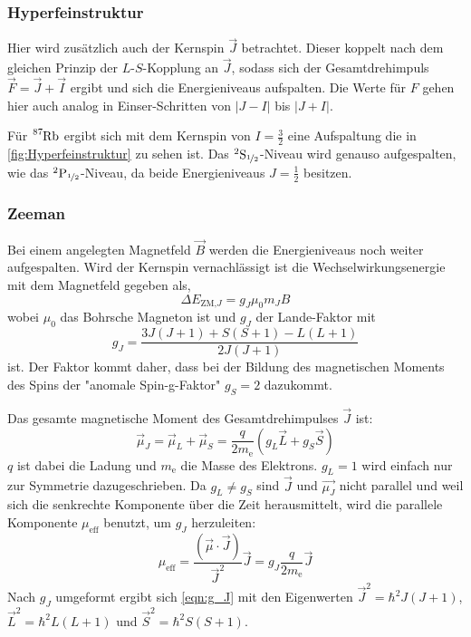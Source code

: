         \subsubsection*{Hyperfeinstruktur}
            Hier wird zusätzlich auch der Kernspin $\vec{J}$ betrachtet. Dieser koppelt nach dem gleichen Prinzip der $L$-$S$-Kopplung an $\vec{J}$, sodass sich der Gesamtdrehimpuls $\vec{F} = \vec{J} + \vec{I}$ ergibt und sich die Energieniveaus aufspalten.
            Die Werte für $F$ gehen hier auch analog in Einser-Schritten von $|J - I|$ bis $|J + I|$.

            Für $\ce{^{87}Rb}$ ergibt sich mit dem Kernspin von $I = \frac{3}{2}$ eine Aufspaltung die in \autoref{fig:Hyperfeinstruktur} zu sehen ist. Das $^2\text{S}_{\nicefrac{1}{2}}$-Niveau wird genauso aufgespalten, wie das $^2\text{P}_{\nicefrac{1}{2}}$-Niveau, da beide Energieniveaus $J = \frac{1}{2}$ besitzen.

        \subsubsection*{Zeeman}
            Bei einem angelegten Magnetfeld $\vec{B}$ werden die Energieniveaus noch weiter aufgespalten.
            Wird der Kernspin vernachlässigt ist die Wechselwirkungsenergie mit dem Magnetfeld gegeben als,
            \begin{equation*}
                \Delta E_{\text{ZM,}J} = g_J \mu_0 m_J B
            \end{equation*}
            wobei $\mu_0$ das Bohrsche Magneton ist und $g_J$ der Lande-Faktor mit
            \begin{equation}
                g_J = \frac{3J(J+1) + S(S+1) - L(L+1)}{2J(J+1)}
                \label{eqn:g_J}
            \end{equation}
            ist. Der Faktor kommt daher, dass bei der Bildung des magnetischen Moments des Spins der "anomale Spin-g-Faktor" $g_S = 2$ dazukommt.

            Das gesamte magnetische Moment des Gesamtdrehimpulses $\vec{J}$ ist:
            \begin{equation*}
                \vec{\mu}_J = \vec{\mu}_L + \vec{\mu}_S = \frac{q}{2m_{\text{e}}} \left(g_L \vec{L} + g_S \vec{S}\right)
            \end{equation*}
            $q$ ist dabei die Ladung und $m_\text{e}$ die Masse des Elektrons. $g_L = 1$ wird einfach nur zur Symmetrie dazugeschrieben. Da $g_L \neq g_S$ sind $\vec{J}$ und $\vec{\mu_J}$ nicht parallel und weil sich die senkrechte Komponente über die Zeit herausmittelt, wird die parallele Komponente $\mu_{\text{eff}}$ benutzt, um $g_J$ herzuleiten:
            \begin{equation*}
                \mu_{\text{eff}} = \frac{(\vec{\mu} \cdot \vec{J})}{\vec{J}^2} \vec{J} = g_J \frac{q}{2m_{\text{e}}} \vec{J}
            \end{equation*}
            Nach $g_J$ umgeformt ergibt sich \eqref{eqn:g_J} mit den Eigenwerten $\vec{J}^2 = \hbar^2 J (J+1)$, $\vec{L}^2 = \hbar^2 L (L+1)$ und $\vec{S}^2 = \hbar^2 S (S+1)$.

